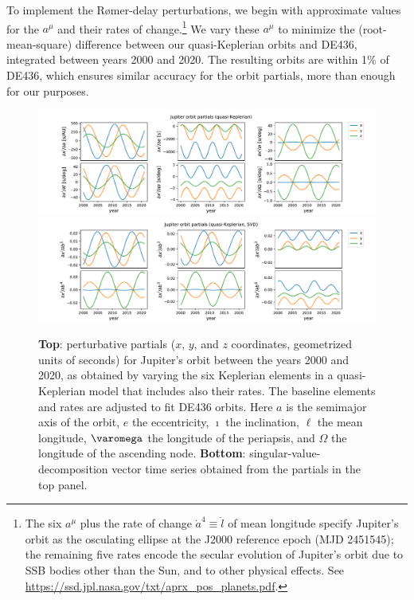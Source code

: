 \documentclass[iop,apj,twocolappendix]{emulateapj}
\begin{document}
\begin{itemize}
To implement the R{\o}mer-delay perturbations, we begin with approximate values for the $a^\mu$ and their rates of change.\footnote{The six $a^\mu$ plus the rate of change $\dot{a}^4 \equiv \dot{l}$ of mean longitude specify Jupiter's orbit as the osculating ellipse at the J2000 reference epoch (MJD 2451545); the remaining five rates encode the secular evolution of Jupiter's orbit due to SSB bodies other than the Sun, and to other physical effects. See \href{https://ssd.jpl.nasa.gov/txt/aprx_pos_planets.pdf}{https://ssd.jpl.nasa.gov/txt/aprx\_pos\_planets.pdf}.}
We vary these $a^\mu$ to minimize the (root-mean-square) difference between our quasi-Keplerian orbits and DE436, integrated between years 2000 and 2020. The resulting orbits are within 1\% of DE436, which ensures similar accuracy for the orbit partials, more than enough for our purposes.
%
\begin{figure}[t]
    \centering
    \includegraphics[width=2\columnwidth]{figures/JupiterPartials.pdf}
    \includegraphics[width=2\columnwidth]{figures/JupiterPartialsSVD.pdf}
    \caption{\textbf{Top}: perturbative partials ($x$, $y$, and $z$ coordinates, geometrized units of seconds) for Jupiter's orbit between the years 2000 and 2020, as obtained by varying the six Keplerian elements in a quasi-Keplerian model that includes also their rates. The baseline elements and rates are adjusted to fit DE436 orbits.
    Here $a$ is the semimajor axis of the orbit, $e$ the eccentricity, $\imath$ the inclination, $\ell$ the mean longitude, $\varomega$ the longitude of the periapsis, and $\Omega$ the longitude of the ascending node. 
    \textbf{Bottom}: singular-value-decomposition vector time series obtained from the partials in the top panel.}
    \label{fig:jupiterorbit}
\end{figure}


\end{itemize}
\end{document}
